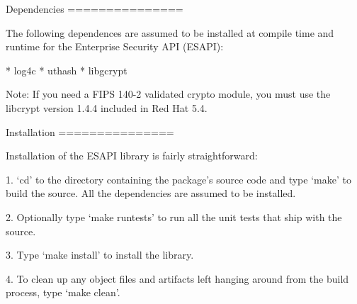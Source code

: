 \begin{DoxyVerbInclude}
Dependencies
===============

The following dependences are assumed to be installed at compile time
and runtime for the Enterprise Security API (ESAPI):

* log4c 
* uthash
* libgcrypt

Note: If you need a FIPS 140-2 validated crypto module, you must use
the libcrypt version 1.4.4 included in Red Hat 5.4.

Installation
===============

Installation of the ESAPI library is fairly straightforward:

  1. `cd' to the directory containing the package's source code and type
     `make' to build the source. All the dependencies are assumed to be
     installed.

  2. Optionally type `make runtests' to run all the unit tests that ship
     with the source.

  3. Type `make install' to install the library.

  4. To clean up any object files and artifacts left hanging around from
     the build process, type `make clean'.
\end{DoxyVerbInclude}
 